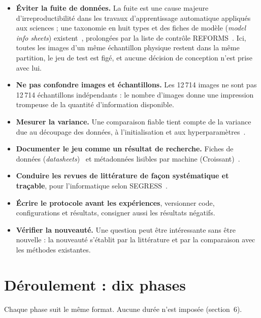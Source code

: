 \documentclass[11pt,a4paper]{article}
\begin{document}
\begin{itemize}
  \item \textbf{Éviter la fuite de données.} La fuite est une cause majeure d'irreproductibilité dans les travaux d'apprentissage automatique appliqués aux sciences ; une taxonomie en huit types et des fiches de modèle (\emph{model info sheets}) existent~\cite{kapoor}, prolongées par la liste de contrôle REFORMS~\cite{reforms}. Ici, toutes les images d'un même échantillon physique restent dans la même partition, le jeu de test est figé, et aucune décision de conception n'est prise avec lui.
  \item \textbf{Ne pas confondre images et échantillons.} Les 12\,714 images ne sont pas 12\,714 échantillons indépendants : le nombre d'images donne une impression trompeuse de la quantité d'information disponible.
  \item \textbf{Mesurer la variance.} Une comparaison fiable tient compte de la variance due au découpage des données, à l'initialisation et aux hyperparamètres~\cite{bouthillier}.
  \item \textbf{Documenter le jeu comme un résultat de recherche.} Fiches de données (\emph{datasheets})~\cite{gebru} et métadonnées lisibles par machine (Croissant)~\cite{croissant}.
  \item \textbf{Conduire les revues de littérature de façon systématique et traçable}, pour l'informatique selon SEGRESS~\cite{segress}.
  \item \textbf{Écrire le protocole avant les expériences}, versionner code, configurations et résultats, consigner aussi les résultats négatifs.
  \item \textbf{Vérifier la nouveauté.} Une question peut être intéressante sans être nouvelle : la nouveauté s'établit par la littérature et par la comparaison avec les méthodes existantes.
\end{itemize}

\section{Déroulement : dix phases}

Chaque phase suit le même format. Aucune durée n'est imposée (section~6).
\end{document}
